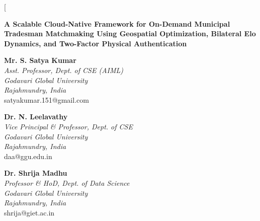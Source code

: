 \documentclass[10pt,twocolumn,a4paper]{article}
\begin{document}
\twocolumn[{
  \begin{center}
    {\Large \textbf{A Scalable Cloud-Native Framework for On-Demand Municipal Tradesman Matchmaking Using Geospatial Optimization, Bilateral Elo Dynamics, and Two-Factor Physical Authentication} \par}
    \vspace{0.4em}

    \begin{minipage}[t]{0.31\textwidth}
      \centering
      \textbf{Mr. S. Satya Kumar}\\
      \textit{Asst. Professor, Dept. of CSE (AIML)}\\
      \textit{Godavari Global University}\\
      \textit{Rajahmundry, India}\\
      satyakumar.151@gmail.com
    \end{minipage}
    \hfill
    \begin{minipage}[t]{0.31\textwidth}
      \centering
      \textbf{Dr. N. Leelavathy}\\
      \textit{Vice Principal \& Professor, Dept. of CSE}\\
      \textit{Godavari Global University}\\
      \textit{Rajahmundry, India}\\
      daa@ggu.edu.in
    \end{minipage}
    \hfill
    \begin{minipage}[t]{0.31\textwidth}
      \centering
      \textbf{Dr. Shrija Madhu}\\
      \textit{Professor \& HoD, Dept. of Data Science}\\
      \textit{Godavari Global University}\\
      \textit{Rajahmundry, India}\\
      shrija@giet.ac.in
    \end{minipage}

    \vspace{0.3em}


\end{center}}
\end{document}
